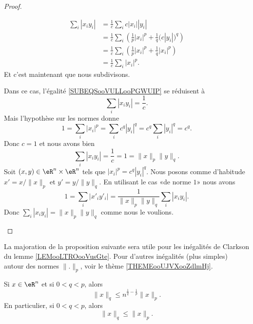 \begin{proof}
\begin{subproof}
\begin{subequations}
			\begin{align}
				\sum_i| x_iy_i | & =\frac{1}{ c }\sum_ic| x_i | |y_i |                                                           \\
				                 & =\frac{1}{ c }\sum_i\left( \frac{1}{ p }| x_i |^p+\frac{1}{ q }\big( c| y_i | \big)^q \right) \\
				                 & =\frac{1}{ c }\sum_i\left( \frac{1}{ p }| x_i |^p+\frac{1}{ q }| x_i |^p \right)              \\
				                 & =\frac{1}{ c }\sum_i| x_i |^p.
			\end{align}
		\end{subequations}
		Et c'est maintenant que nous subdivisons.
		\begin{subproof}
			\spitem[Si \( \| x \|_p=\| y \|_q=1\)]
			Dans ce cas, l'égalité \eqref{SUBEQSooVULLooPGWUIP} se réduisent à
			\begin{equation}
				\sum_i| x_iy_i |=\frac{1}{ c }.
			\end{equation}
			Mais l'hypothèse sur les normes donne
			\begin{equation}
				1=\sum_i| x_i |^p=\sum_ic^q| y_i |^q=c^q\sum_i| y_i |^q=c^q.
			\end{equation}
			Donc \( c=1\) et nous avons bien
			\begin{equation}
				\sum_i| x_iy_i |=\frac{1}{ c }=1=\| x \|_p\| y \|_q.
			\end{equation}
			Soit \( (x,y)\in \eR^n\times \eR^n\) tels que \( | x_i |^p=c^q| y_i |^q\). Nous posons comme d'habitude \( x'=x/\| x \|_p\) et \( y'=y/\| y \|_q\). En utilisant le cas «de norme \( 1\)» nous avons
			\begin{equation}
				1=\sum_i| x'_iy'_i |=\frac{1}{ \| x \|_p\| y \|_q }\sum_i| x_iy_i |.
			\end{equation}
			Donc \( \sum_i| x_iy_i |=\| x \|_p\| y \|_q\) comme nous le voulions.
		\end{subproof}
	\end{subproof}
\end{proof}

La majoration de la proposition suivante sera utile pour les inégalités de Clarkson du lemme \ref{LEMooLTROooVusGte}. Pour d'autres inégalités (plus simples) autour des normes \( \| . \|_p\), voir le thème \ref{THEMEooUJVXooZdlmHj}.
\begin{proposition}       \label{PROPooQZTNooGACMlQ}
	Si \( x\in \eR^n\) et si \( 0<q<p\), alors
	\begin{equation}
		\| x \|_q\leq n^{\frac{1}{ q }-\frac{1}{ p }}   \| x \|_p.
	\end{equation}
	En particulier, si \( 0 < q < p\), alors
	\begin{equation}
		\| x \|_q\leq \| x \|_p.
	\end{equation}
\end{proposition}

